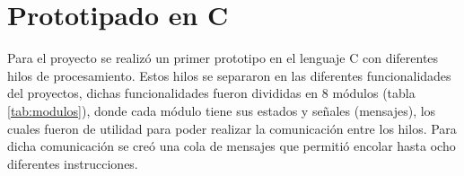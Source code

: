 \pagebreak
\section{Prototipado en C}

Para el proyecto se realizó un primer prototipo en el lenguaje C con diferentes hilos de procesamiento. Estos hilos se separaron en las diferentes funcionalidades del proyectos, dichas funcionalidades fueron divididas en 8 módulos (tabla \ref{tab:modulos}), donde cada módulo tiene sus estados y señales (mensajes), los cuales fueron de utilidad para poder realizar la comunicación entre los hilos. Para dicha comunicación se creó una cola de mensajes que permitió encolar hasta ocho diferentes instrucciones. 

